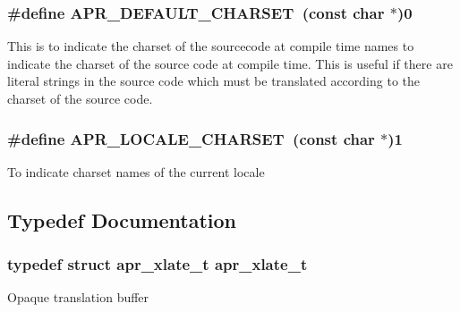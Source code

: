 \subsubsection[{\texorpdfstring{A\+P\+R\+\_\+\+D\+E\+F\+A\+U\+L\+T\+\_\+\+C\+H\+A\+R\+S\+ET}{APR_DEFAULT_CHARSET}}]{\setlength{\rightskip}{0pt plus 5cm}\#define A\+P\+R\+\_\+\+D\+E\+F\+A\+U\+L\+T\+\_\+\+C\+H\+A\+R\+S\+ET~(const char $\ast$)0}\hypertarget{group__APR__XLATE_ga3276c680eb0917ff51ff22c9b9959fa9}{}\label{group__APR__XLATE_ga3276c680eb0917ff51ff22c9b9959fa9}
This is to indicate the charset of the sourcecode at compile time names to indicate the charset of the source code at compile time. This is useful if there are literal strings in the source code which must be translated according to the charset of the source code. 
\subsubsection[{\texorpdfstring{A\+P\+R\+\_\+\+L\+O\+C\+A\+L\+E\+\_\+\+C\+H\+A\+R\+S\+ET}{APR_LOCALE_CHARSET}}]{\setlength{\rightskip}{0pt plus 5cm}\#define A\+P\+R\+\_\+\+L\+O\+C\+A\+L\+E\+\_\+\+C\+H\+A\+R\+S\+ET~(const char $\ast$)1}\hypertarget{group__APR__XLATE_ga0e46c333fb1c900f0dd4a78664f5a0de}{}\label{group__APR__XLATE_ga0e46c333fb1c900f0dd4a78664f5a0de}
To indicate charset names of the current locale 

\subsection{Typedef Documentation}
\subsubsection[{\texorpdfstring{apr\+\_\+xlate\+\_\+t}{apr_xlate_t}}]{\setlength{\rightskip}{0pt plus 5cm}typedef struct {\bf apr\+\_\+xlate\+\_\+t} {\bf apr\+\_\+xlate\+\_\+t}}\hypertarget{group__APR__XLATE_ga069dabbadc30e3a4157c38104a250e77}{}\label{group__APR__XLATE_ga069dabbadc30e3a4157c38104a250e77}
Opaque translation buffer 

